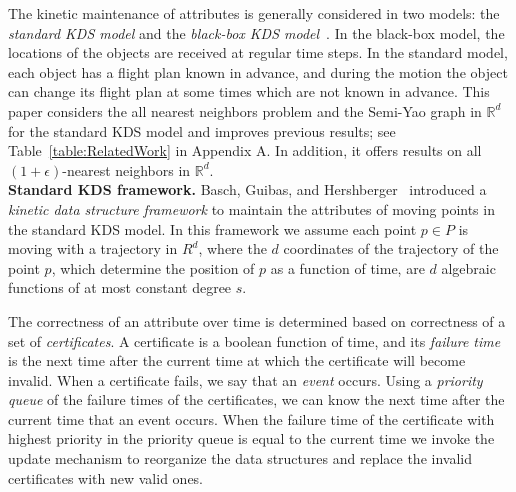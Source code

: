 \documentclass[11pt]{llncs}
\begin{document}
The kinetic maintenance of attributes is generally considered in two models: the \textit{standard KDS model} and the \textit{black-box KDS model}~\cite{Gao:2006:DSA:1646483.1646577,deBerg:2011:KCH:1998196.1998233}. In the black-box model, the locations of the objects are received at regular time steps. In the standard model, each object has a flight plan known in advance, and during the motion the object can change its flight plan at some times which are not known in advance. This paper considers the all nearest neighbors problem and the Semi-Yao graph in $\mathbb{R}^d$ for the standard KDS model and improves previous results; see Table~\ref{table:RelatedWork} in Appendix A. In addition, it offers results on all $(1+\epsilon)$-nearest neighbors in $\mathbb{R}^d$.
\vspace{+5pt}
\\
\textbf{Standard KDS framework.}
Basch, Guibas, and Hershberger~\cite{Basch:1997:DSM:314161.314435} introduced a \textit{kinetic data structure framework} to maintain the attributes of moving points in the standard KDS model. In this framework we assume each point $p\in P$ is moving with a trajectory  in $R^d$, where the $d$ coordinates of the trajectory of  the point $p$, which determine the position of $p$ as a function of time, are $d$ algebraic functions of at most constant degree $s$.  

The correctness of an attribute over time is determined based on correctness of a set of \textit{certificates}. A certificate is a boolean function of time, and its \textit{failure time} is the next time after the current time at which the certificate will become invalid. When a certificate fails, we say that an \textit{event} occurs. Using a \textit{priority queue} of the failure times of the certificates, we can know the next time after the current time that an event occurs. When the failure time of the certificate with highest priority in the priority queue is equal to the current time we invoke the update mechanism to reorganize the data structures and replace the invalid certificates with new valid ones. 
\end{document}
